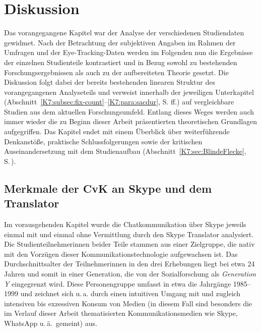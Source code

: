 \chapter{Diskussion}\label{K7}


Das vorangegangene Kapitel war der Analyse der verschiedenen Studiendaten gewidmet. Nach der Betrachtung der subjektiven Angaben im Rahmen der Umfragen und der Eye-Tracking-Daten werden im Folgenden nun die Ergebnisse der einzelnen Studienteile kontrastiert und in Bezug sowohl zu bestehenden Forschungsergebnissen als auch zu der aufbereiteten Theorie gesetzt. Die Diskussion folgt dabei der bereits bestehenden linearen Struktur des vorangegangenen Analyseteils und verweist innerhalb der jeweiligen Unterkapitel (Abschnitt~\ref{K7:subsec:fix-count}–\ref{K7:para:sacdur}, S.\,\pageref{K7:subsec:fix-count}\,ff.) auf vergleichbare Studien aus dem aktuellen Forschungsumfeld. Entlang dieses Weges werden auch immer wieder die zu Beginn dieser Arbeit präsentierten theoretischen Grundlagen aufgegriffen. Das Kapitel endet mit einem Überblick über weiterführende Denkanstöße, praktische Schlussfolgerungen sowie der kritischen Auseinandersetzung mit dem Studienaufbau (Abschnitt~\ref{K7:sec:BlindeFlecke}, S.\,\pageref{K7:sec:BlindeFlecke}). 


\section{Merkmale der CvK an Skype und dem Translator}
\label{K7:sec:Skype-CMC}


Im vorausgehenden Kapitel wurde die Chatkommunikation über Skype jeweils einmal mit und einmal ohne Vermittlung durch den Skype Translator analysiert. Die Studienteilnehmer{\textperiodcentered}innen beider Teile stammen aus einer Zielgruppe, die nativ mit den Vorzügen dieser Kommunikationstechnologie aufgewachsen ist. Das Durchschnittsalter der Teilnehmer{\textperiodcentered}innen in den drei Erhebungen liegt bei etwa 24 Jahren und somit in einer Generation, die von der Sozialforschung als \emph{Generation Y} eingegrenzt wird. Diese Personengruppe umfasst in etwa die Jahrgänge 1985--1999 und zeichnet sich u.\,a. durch einen intuitiven Umgang mit und zugleich intensiven bis exzessiven Konsum von Medien (in diesem Fall sind besonders die im Verlauf dieser Arbeit thematisierten Kommunikationsmedien wie Skype, WhatsApp u.\,ä.\ gemeint) aus.

